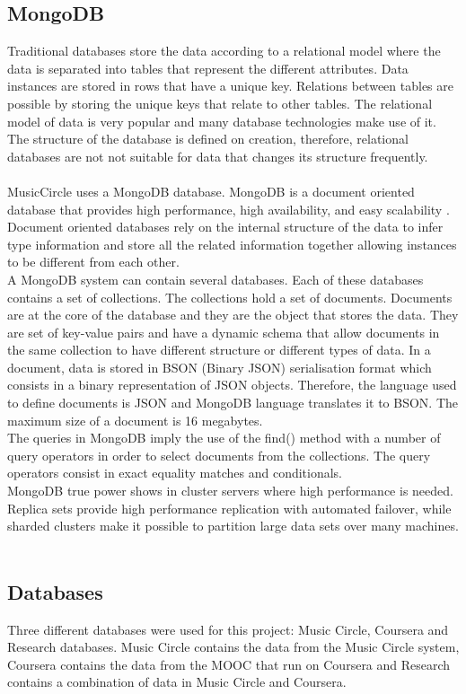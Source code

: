 \documentclass[11pt, oneside]{article}   	%
\begin{document}
\subsection{MongoDB}
Traditional databases store the data according to a relational model where the data is separated into tables that represent the different attributes. Data instances are stored in rows that have a unique key. Relations between tables are possible by storing the unique keys that relate to other tables. The relational model of data is very popular and many database technologies make use of it. The structure of the database is defined on creation, therefore, relational databases are not not suitable for data that changes its structure frequently.\\\\
MusicCircle uses a MongoDB database. MongoDB is a document oriented database that provides high performance, high availability, and easy scalability \cite{MongoIntro}.
Document oriented databases rely on the internal structure of the data to infer type information and store all the related information together allowing instances to be different from each other.\\
A MongoDB system can contain several databases. Each of these databases contains a set of collections. The collections hold a set of documents. Documents are at the core of the database and they are the object that stores the data. They are set of key-value pairs and have a dynamic schema that allow documents in the same collection to have different structure or different types of data. In a document, data is stored in BSON (Binary JSON) serialisation format which consists in a binary representation of JSON objects. Therefore, the language used to define documents is JSON and MongoDB language translates it to BSON. The maximum size of a document is 16 megabytes.\\
The queries in MongoDB imply the use of the find() method with a number of query operators in order to select documents from the collections. The query operators consist in exact equality matches and conditionals.\\
MongoDB true power shows in cluster servers where high performance is needed. Replica sets provide high performance replication with automated failover, while sharded clusters make it possible to partition large data sets over many machines.\\\\

\subsection{Databases}
Three different databases were used for this project: Music Circle, Coursera and Research databases. Music Circle contains the data from the Music Circle system, Coursera contains the data from the MOOC that run on Coursera and Research contains a combination of data in Music Circle and Coursera.
\end{document}
